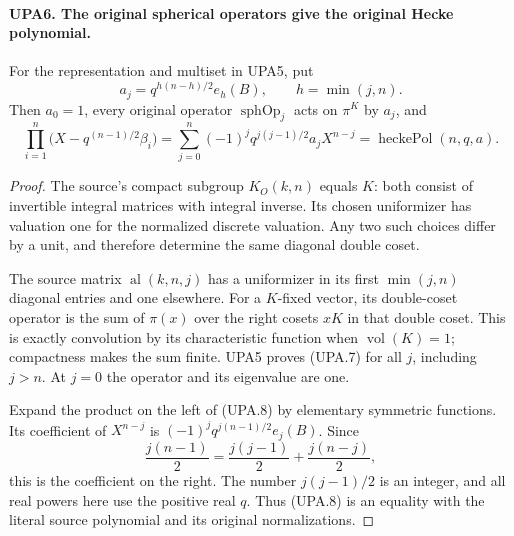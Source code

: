 \paragraph{UPA6. The original spherical operators give the original Hecke polynomial.}
\label{claim:UPA6}
For the representation and multiset in UPA5, put
\[
 a_j=q^{h(n-h)/2}e_h(B),\qquad h=\min(j,n).
 \tag{UPA.7}
\]
Then $a_0=1$, every original operator $\operatorname{sphOp}_j$
acts on $\pi^K$ by $a_j$, and
\[
 \prod_{i=1}^n\bigl(X-q^{(n-1)/2}\beta_i\bigr)
 =\sum_{j=0}^n(-1)^j q^{j(j-1)/2}a_jX^{n-j}
 =\operatorname{heckePol}(n,q,a).
 \tag{UPA.8}
\]
\begin{proof}
The source's compact subgroup $K_O(k,n)$ equals $K$:
both consist of invertible integral matrices with integral inverse.
Its chosen uniformizer has valuation one for the normalized
discrete valuation.  Any two such choices differ by a unit,
and therefore determine the same diagonal double coset.

The source matrix $\operatorname{al}(k,n,j)$ has a uniformizer
in its first $\min(j,n)$ diagonal entries and one elsewhere.
For a $K$-fixed vector, its double-coset operator is the
sum of $\pi(x)$ over the right cosets $xK$ in that double
coset.  This is exactly convolution by its characteristic
function when $\operatorname{vol}(K)=1$; compactness makes
the sum finite.  UPA5 proves (UPA.7) for all $j$, including
$j>n$.  At $j=0$ the operator and its eigenvalue are one.

Expand the product on the left of (UPA.8) by elementary
symmetric functions.  Its coefficient of $X^{n-j}$ is
$(-1)^j q^{j(n-1)/2}e_j(B)$.  Since
\[
       \frac{j(n-1)}2
          =\frac{j(j-1)}2+\frac{j(n-j)}2,
\]
this is the coefficient on the right.  The number
$j(j-1)/2$ is an integer, and all real powers here use the
positive real $q$.  Thus (UPA.8) is an equality with the
literal source polynomial and its original normalizations.
\end{proof}

